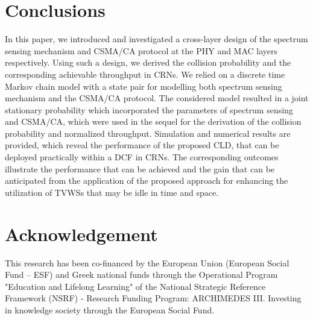 \documentclass
[journal,11pt,draftclsnofoot,onecolumn,doublespace]{tETN2e}
\begin{document}
\section{Conclusions}
In this paper, we introduced and investigated a cross-layer design of the spectrum sensing mechanism and CSMA/CA protocol at the PHY and MAC layers respectively. Using such a design, we derived the collision probability and the corresponding achievable throughput in CRNs. We relied on a discrete time Markov chain model with a state pair for modelling both spectrum sensing mechanism and the CSMA/CA protocol. The considered model resulted in a joint stationary probability which incorporated the parameters of spectrum sensing and CSMA/CA, which were used in the sequel for the derivation of the collision probability and normalized throughput. Simulation and numerical results are provided, which reveal the performance of the proposed CLD, that can be deployed practically within a DCF in CRNs. The corresponding outcomes illustrate the performance that can be achieved and the gain that can be anticipated from the application of the proposed approach for enhancing the utilization of TVWSs that may be idle in time and space.

\section*{Acknowledgement}
This research has been co-financed by the European Union (European Social Fund – ESF) and Greek national funds through the Operational Program "Education and Lifelong Learning" of the National Strategic Reference Framework (NSRF) - Research Funding Program: ARCHIMEDES III. Investing in knowledge society through the European Social Fund.
\end{document}
